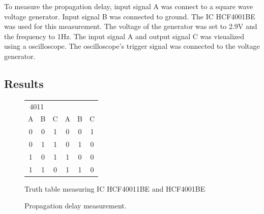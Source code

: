 \documentclass[journal]{IEEEtran}
\begin{document}
To measure the propagation delay, input signal A was connect to a square wave
voltage generator. Input signal B was connected to ground. The IC HCF4001BE
was used for this measurement. The voltage of the generator was set to 2.9V and
the frequency to 1Hz. The input signal A and output signal C was visualized
using a oscilloscope. The oscilloscope's trigger signal was connected to the voltage
generator.

\subsection{Results}

\begin{figure}
	\centering
	\begin{tabular}{c c | c || c c | c}
 		 \multicolumn{2}{c}{4011}
  		 \multicolumn{5}{c}{4001} \\
		  A & B & C & A & B & C \\ \hline
		  0 & 0 & 1 & 0 & 0 & 1 \\
		  0 & 1 & 1 & 0 & 1 & 0 \\
		  1 & 0 & 1 & 1 & 0 & 0 \\
		  1 & 1 & 0 & 1 & 1 & 0 \\
	\end{tabular}
	\caption{Truth table measuring IC HCF40011BE and HCF4001BE}
	\label{tab:truthtable} 
\end{figure}

 \begin{figure}
   \centering
  \caption{Propagation delay measurement.}
  \label{fig:propdelay}
\end{figure}
\end{document}
